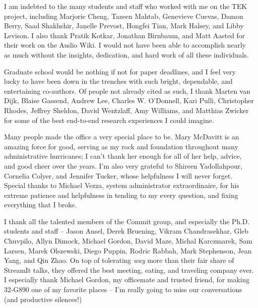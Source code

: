 I am indebted to the many students and staff who worked with me on
the TEK project, including Marjorie Cheng, Tazeen Mahtab, Genevieve
Cuevas, Damon Berry, Saad Shakhshir, Janelle Prevost, Hongfei Tian,
Mark Halsey, and Libby Levison.  I also thank Pratik Kotkar,
Jonathan Birnbaum, and Matt Aasted for their work on the Audio Wiki.
I would not have been able to accomplish nearly as much without the
insights, dedication, and hard work of all these individuals.

%

Graduate school would be nothing if not for paper deadlines, and I
feel very lucky to have been down in the trenches with such bright,
dependable, and entertaining co-authors.  Of people not already cited
as such, I thank Marten van Dijk, Blaise Gassend, Andrew Lee, Charles
W. O'Donnell, Kari Pulli, Christopher Rhodes, Jeffrey Sheldon, David
Wentzlaff, Amy Williams, and Matthias Zwicker for some of the best
end-to-end research experiences I could imagine.

Many people made the office a very special place to be.  Mary
McDavitt is an amazing force for good, serving as my rock and
foundation throughout many administrative hurricanes; I can't thank
her enough for all of her help, advice, and good cheer over the
years.  I'm also very grateful to Shireen Yadollahpour, Cornelia
Colyer, and Jennifer Tucker, whose helpfulness I will never forget.
Special thanks to Michael Vezza, system administrator
extraordinaire, for his extreme patience and helpfulness in tending
to my every question, and fixing everything that I broke.

I thank all the talented members of the Commit group, and especially
the Ph.D. students and staff -- Jason Ansel, Derek Bruening, Vikram
Chandrasekhar, Gleb Chuvpilo, Allyn Dimock, Michael Gordon, David
Maze, Michal Karczmarek, Sam Larsen, Marek Olszewski, Diego Puppin,
Rodric Rabbah, Mark Stephenson, Jean Yang, and Qin Zhao.  On top of
tolerating {\it way} more than their fair share of StreamIt talks,
they offered the best meeting, eating, and traveling company ever.  I
especially thank Michael Gordon, my officemate and trusted friend, for
making 32-G890 one of my favorite places -- I'm really going to miss
our conversations (and productive silences!)

